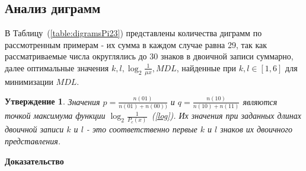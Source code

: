 \documentclass[12pt]{article}
\newtheorem{sttm}{Утверждение}
\begin{document}
	\subsection*{Анализ диграмм}
	В Таблицу~(\ref{table:digramsPi23}) представлены количества диграмм по рассмотренным примерам - их сумма в каждом случае равна 29, так как рассматриваемые числа округлялись до 30 знаков в двоичной записи суммарно, далее оптимальные значения $k,l,\log_2{\frac{1}{\mu{x}}},MDL$, найденные при $k,l\in[1,6]$ для минимизации $MDL$.
	\begin{sttm}\label{derivative}Значения $p = \frac{n(01)}{n(01)+n(00))}$ и $q = \frac{n(10)}{n(10)+n(11)}$ являются точкой максимума функции $\log_2{\frac{1}{P_c(x)}}$~(\ref{log}). Их значения при заданных длинах двоичной записи $k$ и $l$ - это соответственно первые $k$ и $l$ знаков их двоичного представления.\end{sttm}
	{\bf Доказательство}
\end{document}
